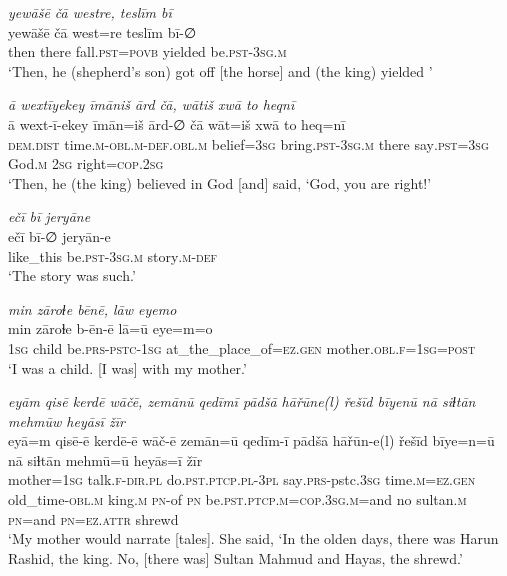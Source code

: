 \ea \label{KŠ.103}
\textit{yewāšē čā westre, teslīm bī} \\ 
\gll yewāšē čā west=re teslīm bī-∅ \\ 
 then there fall\textsc{.pst}\textsc{=\textsc{povb}} yielded be\textsc{.pst}\textsc{-3sg}\textsc{.m} \\ 
\glt `Then, he (shepherd’s son) got off [the horse] and (the king) yielded  '
\z 
 
\ea \label{KŠ.104}
\textit{ā wextīyekey īmāniš ārd čā, wātiš xwā to heqnī} \\ 
\gll ā wext-ī-ekey īmān=iš ārd-∅ čā wāt=iš xwā to heq=nī \\ 
 \textsc{dem.dist} time\textsc{.m}\textsc{-obl}\textsc{.m}\textsc{-def}\textsc{.obl}\textsc{.m} belief\textsc{=3sg} bring\textsc{.pst}\textsc{-3sg}\textsc{.m} there say\textsc{.pst}\textsc{=3sg} God\textsc{.m} \textsc{2sg} right\textsc{=cop}\textsc{.\textsc{2sg}} \\ 
\glt `Then, he (the king) believed in God [and] said, ‘God, you are right!'
\z 
 
\ea \label{KŠ.106}
\textit{ečī bī jeryāne} \\ 
\gll ečī bī-∅ jeryān-e \\ 
 like\_this be\textsc{.pst}\textsc{-3sg}\textsc{.m} story\textsc{.m}\textsc{-def} \\ 
\glt `The story was such.'
\z 
 
\ea \label{ŽH.1}
\textit{min zāroɫe bēnē, lāw eyemo} \\ 
\gll min zāroɫe b-ēn-ē lā=ū eye=m=o \\ 
 \textsc{1sg} child be\textsc{.prs}\textsc{-pstc}\textsc{-1sg} at\_the\_place\_of\textsc{=ez}\textsc{.gen} mother\textsc{.obl}\textsc{\textsc{.f}}\textsc{=1sg}\textsc{=\textsc{post}} \\ 
\glt `I was a child. [I was] with my mother.'
\z 
 
\ea \label{ŽH.2}
\textit{eyām qisē kerdē wāčē, zemānū qedīmī pādšā hāřūne(l) řešīd bīyenū nā siɫtān mehmūw heyāsī žīr} \\ 
\gll eyā=m qisē-ē kerdē-ē wāč-ē zemān=ū qedīm-ī pādšā hāřūn-e(l) řešīd bīye=n=ū nā siɫtān mehmū=ū heyās=ī žīr \\ 
 mother\textsc{=1sg} talk\textsc{\textsc{.f}}\textsc{-dir}\textsc{.pl} do\textsc{.pst}\textsc{.ptcp}\textsc{.pl}\textsc{-3pl} say\textsc{.prs-}pstc\textsc{.3sg} time\textsc{.m}\textsc{=ez}\textsc{.gen} old\_time\textsc{-obl}\textsc{.m} king\textsc{.m} \textsc{pn}-of \textsc{pn} be\textsc{.pst}\textsc{.ptcp}\textsc{.m}\textsc{=cop}\textsc{.3sg}\textsc{.m}=and no sultan\textsc{.m} \textsc{pn}=and \textsc{pn}\textsc{=ez}.\textsc{attr} shrewd \\ 
\glt `My mother would narrate [tales]. She said, ‘In the olden days, there was Harun Rashid, the king. No, [there was] Sultan Mahmud and Hayas, the shrewd.'
\z 
 
